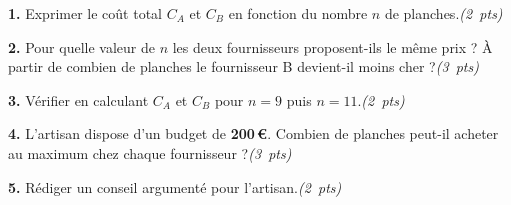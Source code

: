 \documentclass[a4paper,11pt]{article}
\newcommand{\pts}[1]{\hfill\textit{(#1~pts)}}
\newcommand{\reponse}{\par\noindent\dotfill\par}
\newcommand{\reponselong}{%
  \par\noindent\dotfill\par\noindent\dotfill\par}
\begin{document}
\medskip

\textbf{1.}  Exprimer le coût total $C_A$ et $C_B$ en fonction du nombre $n$ de planches.\pts{2}

\reponse
\reponse

\vspace{4pt}

\textbf{2.}  Pour quelle valeur de $n$ les deux fournisseurs proposent-ils le même prix ? À partir de combien de planches le fournisseur B devient-il moins cher ?\pts{3}

\reponselong
\reponse

\vspace{4pt}

\textbf{3.}  Vérifier en calculant $C_A$ et $C_B$ pour $n = 9$ puis $n = 11$.\pts{2}

\reponselong

\vspace{4pt}

\textbf{4.}  L'artisan dispose d'un budget de \textbf{200\,\euro{}}. Combien de planches peut-il acheter au maximum chez chaque fournisseur ?\pts{3}

\reponselong
\reponse

\vspace{4pt}

\textbf{5.}  Rédiger un conseil argumenté pour l'artisan.\pts{2}

\reponse
\reponselong
\end{document}
